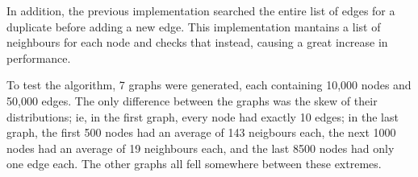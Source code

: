 In addition, the previous implementation searched the entire list of edges for a duplicate before adding a new edge. This implementation mantains a list of neighbours for each node and checks that instead, causing a great increase in performance.

To test the algorithm, 7 graphs were generated, each containing 10,000 nodes and 50,000 edges. The only difference between the graphs was the skew of their distributions; ie, in the first graph, every node had exactly 10 edges; in the last graph, the first 500 nodes had an average of 143 neigbours each, the next 1000 nodes had an average of 19 neighbours each, and the last 8500 nodes had only one edge each. The other graphs all fell somewhere between these extremes.
